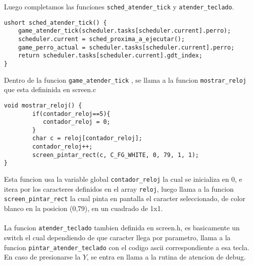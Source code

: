 \newpage

\noindent Luego completamos las funciones \texttt{sched\_atender\_tick} y \texttt{atender\_teclado}.

\begin{codesnippet}
\begin{verbatim}
ushort sched_atender_tick() {    
    game_atender_tick(scheduler.tasks[scheduler.current].perro);
    scheduler.current = sched_proxima_a_ejecutar();
    game_perro_actual = scheduler.tasks[scheduler.current].perro;
    return scheduler.tasks[scheduler.current].gdt_index;
}
\end{verbatim}
\end{codesnippet}

\noindent Dentro de la funcion \texttt{game\_atender\_tick} , se llama a la funcion \texttt{mostrar\_reloj} que esta defininida en screen.c

\begin{codesnippet}
\begin{verbatim}
void mostrar_reloj() {
        if(contador_reloj==5){
           contador_reloj = 0;
        }
        char c = reloj[contador_reloj];
        contador_reloj++;
        screen_pintar_rect(c, C_FG_WHITE, 0, 79, 1, 1);
}
\end{verbatim}
\end{codesnippet}

\noindent Esta funcion usa la variable global \texttt{contador\_reloj} la cual se inicializa en 0, e itera por los caracteres definidos en el array \texttt{reloj}, luego llama a la funcion \texttt{screen\_pintar\_rect} la cual pinta en pantalla el caracter seleccionado, de color blanco en la posicion (0,79), en un cuadrado de 1x1.
\\
\\
La funcion \texttt{atender\_teclado} tambien definida en screen.h, es basicamente un switch el cual dependiendo de que caracter llega por parametro, llama a la funcion \texttt{pintar\_atender\_teclado} con el codigo ascii correspondiente a esa tecla. En caso de presionarse la $Y$, se entra en llama a la rutina de atencion de debug.

